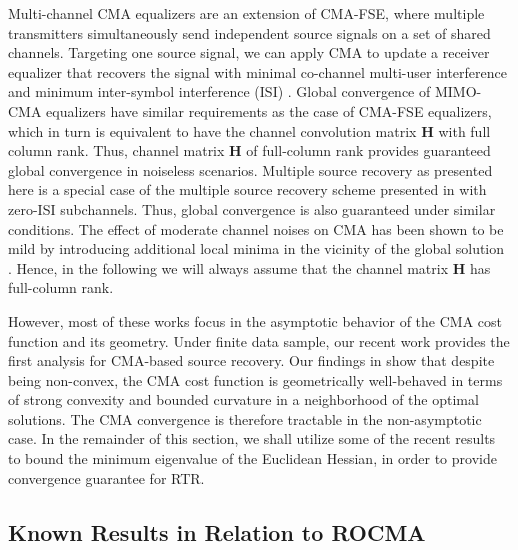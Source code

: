 Multi-channel CMA equalizers are an extension of CMA-FSE, where multiple transmitters
simultaneously send independent source signals on a set of shared channels. 
Targeting one source signal, we can apply CMA to update a receiver 
equalizer that recovers the signal with minimal co-channel
multi-user interference and minimum inter-symbol interference (ISI) \cite{Mayrargue1994mimocma,Li1998adaptivemimocma}.
Global convergence of MIMO-CMA equalizers have similar requirements as the case of CMA-FSE equalizers, which in turn is equivalent to have the channel convolution matrix $\bm{H}$ with full column rank.
Thus, channel matrix $\bm{H}$ of full-column rank provides guaranteed global convergence in noiseless scenarios. 
Multiple source recovery as presented here is a special case of the multiple source recovery scheme presented in \cite{Li1998adaptivemimocma} with zero-ISI subchannels. Thus, global convergence is 
also guaranteed under similar conditions.  
The effect of moderate channel noises on CMA has been shown to be mild by
introducing additional
local minima in the vicinity of the global solution 
\cite{zeng1998relationships,zeng1999analysis}. 
Hence, in the following we will always assume that the channel 
matrix $\bm{H}$ has full-column rank. 


However, most of these works focus in the asymptotic behavior of the CMA cost 
function and its geometry. 
Under finite data sample, 
our recent work \cite{Feres2019wfcma} provides the first analysis
for CMA-based source recovery. Our findings in \cite{Feres2019wfcma} show
that despite being non-convex, the CMA cost function is geometrically well-behaved 
in terms of strong convexity and bounded curvature in a neighborhood of the optimal solutions.
The CMA convergence is therefore tractable in the non-asymptotic case. 
In the remainder of this section, we shall utilize some of the recent
results to bound the minimum eigenvalue of the Euclidean Hessian, in order
to provide convergence guarantee for RTR. 
			
\subsection{Known Results in Relation to ROCMA}

